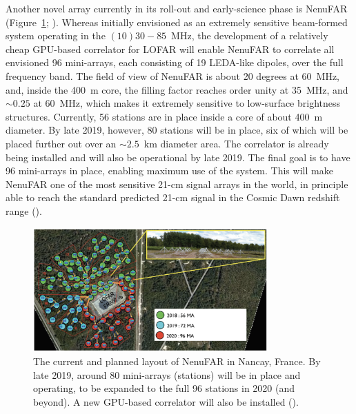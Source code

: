 Another novel array currently in its roll-out and early-science phase is NenuFAR (Figure~\ref{fig:fig_NenuFAR}; \cite{french_ska_white_book}). Whereas initially envisioned as an extremely sensitive beam-formed system operating in  the $(10)30-85$~MHz, the development of a relatively cheap GPU-based correlator for LOFAR will enable NenuFAR to correlate all envisioned 96 mini-arrays, each consisting of 19 LEDA-like dipoles, over the full frequency band. 
The field of view of NenuFAR is about 20 degrees at 60~MHz, and, inside the 400~m core, the filling factor reaches order unity at 35~MHz, and $\sim 0.25$ at 60~MHz, which makes it extremely sensitive to low-surface brightness structures. Currently, 56 stations are in place inside a core of about 400~m diameter.
By late 2019, however, 80 stations will be in place, six of which  will be placed further out over an $\sim 2.5$~km diameter area. The correlator is already being installed and will also be operational by late 2019. The final goal is to have 96 mini-arrays in place, enabling maximum use of the system. This will make NenuFAR one of the most sensitive 21-cm signal arrays in the world, in principle able to reach the standard predicted 21-cm signal in the Cosmic Dawn redshift range (\cite{mesinger16}). 

\begin{figure}[t]
\begin{center}
\includegraphics[width=0.8\textwidth]{Koopmans_Bernardi/NenuFAR.png}
\end{center}
\caption{The current and planned layout of NenuFAR in Nancay, France. By late 2019, around 80 mini-arrays (stations) will be in place and operating, to be expanded to the full 96 stations in 2020 (and beyond). A new GPU-based correlator will also be installed (\cite{french_ska_white_book}).}
\label{fig:fig_NenuFAR}
\end{figure}







